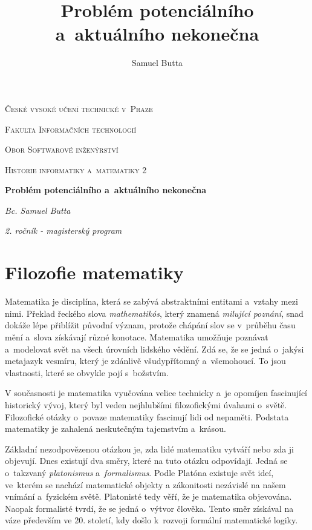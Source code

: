 \documentclass[czech]{article}
\begin{document}
\title{Problém potenciálního a~aktuálního nekonečna}
\author{Samuel Butta}

\begin{titlepage}
\centering
{\scshape\LARGE České vysoké učení technické v~Praze \par}
{\scshape\Large Fakulta Informačních technologií \par}
{\scshape\Large Obor Softwarové inženýrství \par}
\vspace{1cm}
{\scshape\Large Historie informatiky a~matematiky 2\par} 

\vspace{1.5cm}
{\huge\bfseries Problém potenciálního a~aktuálního nekonečna\par}
\vspace{2cm}
{\Large\itshape Bc. Samuel Butta\par}
{\normalsize\itshape 2. ročník - magisterský program\par}
\end{titlepage}

\section*{Filozofie matematiky}

Matematika je disciplína, která se zabývá abstraktními entitami a~vztahy mezi nimi. Překlad řeckého slova \textit{mathematikós}, který znamená \textit{milující poznání}, snad dokáže lépe přiblížit původní význam, protože chápání slov se v~průběhu času mění a~slova získávají různé konotace. Matematika umožňuje poznávat a~modelovat svět na všech úrovních lidského vědění. Zdá se, že se jedná o~jakýsi metajazyk vesmíru, který je zdánlivě všudypřítomný a~všemohoucí. To jsou vlastnosti, které se obvykle pojí s~božstvím.~\cite{livio}

V současnosti je matematika vyučována velice technicky a~je opomíjen fascinující historický vývoj, který byl veden nejhlubšími filozofickými úvahami o~světě. Filozofické otázky o~povaze matematiky fascinují lidi od nepaměti. Podstata matematiky je zahalená neskutečným tajemstvím a~krásou. 

Základní nezodpovězenou otázkou je, zda lidé matematiku vytváří nebo zda ji objevují.
Dnes existují dva směry, které na tuto otázku odpovídají. Jedná se o~takzvaný \textit{platonismus} a~\textit{formalismus}. Podle Platóna existuje svět ideí, ve~kterém se nachází matematické objekty a zákonitosti nezávislé na našem vnímání a~fyzickém světě.
Platonisté tedy věří, že je matematika objevována. Naopak formalisté tvrdí, že se jedná o~výtvor člověka. Tento směr získával na váze především ve 20. století, kdy došlo k~rozvoji formální matematické logiky.
\end{document}
